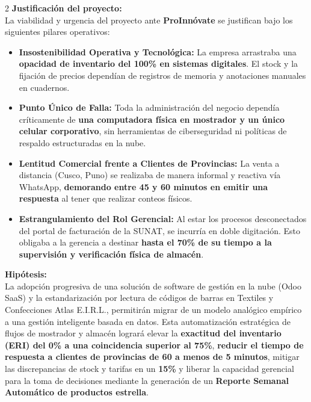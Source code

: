 \documentclass[12pt]{article}
\begin{document}
\begin{multicols}{2}
\textbf{Justificación del proyecto:}\\
La viabilidad y urgencia del proyecto ante \textbf{ProInnóvate} se justifican bajo los siguientes pilares operativos:
\begin{itemize}
    \item \textbf{Insostenibilidad Operativa y Tecnológica:} La empresa arrastraba una \textbf{opacidad de inventario del 100\% en sistemas digitales}. El stock y la fijación de precios dependían de registros de memoria y anotaciones manuales en cuadernos.
    \item \textbf{Punto Único de Falla:} Toda la administración del negocio dependía críticamente de \textbf{una computadora física en mostrador y un único celular corporativo}, sin herramientas de ciberseguridad ni políticas de respaldo estructuradas en la nube.
    \item \textbf{Lentitud Comercial frente a Clientes de Provincias:} La venta a distancia (Cusco, Puno) se realizaba de manera informal y reactiva vía WhatsApp, \textbf{demorando entre 45 y 60 minutos en emitir una respuesta} al tener que realizar conteos físicos.
    \item \textbf{Estrangulamiento del Rol Gerencial:} Al estar los procesos desconectados del portal de facturación de la SUNAT, se incurría en doble digitación. Esto obligaba a la gerencia a destinar \textbf{hasta el 70\% de su tiempo a la supervisión y verificación física de almacén}.
\end{itemize}

\textbf{Hipótesis:}\\
La adopción progresiva de una solución de software de gestión en la nube (Odoo SaaS) y la estandarización por lectura de códigos de barras en Textiles y Confecciones Atlas E.I.R.L., permitirán migrar de un modelo analógico empírico a una gestión inteligente basada en datos. Esta automatización estratégica de flujos de mostrador y almacén logrará elevar la \textbf{exactitud del inventario (ERI) del 0\% a una coincidencia superior al 75\%}, \textbf{reducir el tiempo de respuesta a clientes de provincias de 60 a menos de 5 minutos}, mitigar las discrepancias de stock y tarifas en un \textbf{15\%} y liberar la capacidad gerencial para la toma de decisiones mediante la generación de un \textbf{Reporte Semanal Automático de productos estrella}.


\end{multicols}
\end{document}
